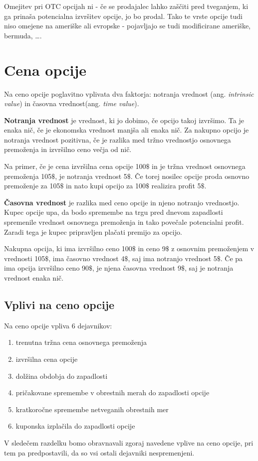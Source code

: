 \documentclass[a4paper]{article}
\begin{document}
Omejitev pri OTC opcijah ni - če se prodajalec lahko zaščiti pred tveganjem, ki ga prinaša potencialna izvršitev opcije, jo bo prodal.
Tako te vrste opcije tudi niso omejene na ameriške ali evropske - pojavljajo se tudi modificirane ameriške, bermuda, \ldots.

\section{Cena opcije} \label{cenaopcij}
Na ceno opcije poglavitno vplivata dva faktorja: notranja vrednost (ang. \textit{intrinsic value}) in časovna vrednost(ang. \textit{time value}).

\textbf{Notranja vrednost} je vrednost, ki jo dobimo, če opcijo takoj izvršimo. Ta je enaka nič, če je ekonomska vrednost manjša ali enaka nič.
Za nakupno opcijo je notranja vrednost pozitivna, če je razlika med tržno vrednostjo osnovnega premoženja in izvršilno ceno večja od nič.

Na primer, če je cena izvršilna cena opcije 100$\$$ in je tržna vrednost osnovnega premoženja 105$\$$, je notranja vrednost 5$\$$. 
Če torej nosilec opcije proda osnovno premoženje za 105$\$$ in nato kupi opcijo za 100$\$$ realizira profit 5$\$$.

\textbf{Časovna vrednost} je razlika med ceno opcije in njeno notranjo vrednostjo. Kupec opcije upa, da bodo spremembe na trgu pred
dnevom zapadlosti spremenile vrednost osnovnega premoženja in tako povečale potencialni profit. Zaradi tega je kupec pripravljen plačati
premijo za opcijo. 

Nakupna opcija, ki ima izvršilno ceno 100$\$$ in ceno 9$\$$ z osnovnim premoženjem v vrednosti 105$\$$, ima časovno vrednost 4$\$$,
saj ima notranjo vrednost 5$\$$. Če pa ima opcija izvršilno ceno 90$\$$, je njena časovna vrednost 9$\$$, saj je notranja vrednost enaka nič.

\subsection{Vplivi na ceno opcije}
Na ceno opcije vpliva 6 dejavnikov:
\begin{enumerate}
    \item trenutna tržna cena osnovnega premoženja
    \item izvršilna cena opcije
    \item dolžina obdobja do zapadlosti
    \item pričakovane spremembe v obrestnih merah do zapadlosti opcije
    \item kratkoročne spremembe netveganih obrestnih mer
    \item kuponska izplačila do zapadlosti opcije
\end{enumerate}
V sledečem razdelku bomo obravnavali zgoraj navedene vplive na ceno opcije, pri tem pa predpostavili, da so vsi ostali
dejavniki nespremenjeni.
\end{document}
